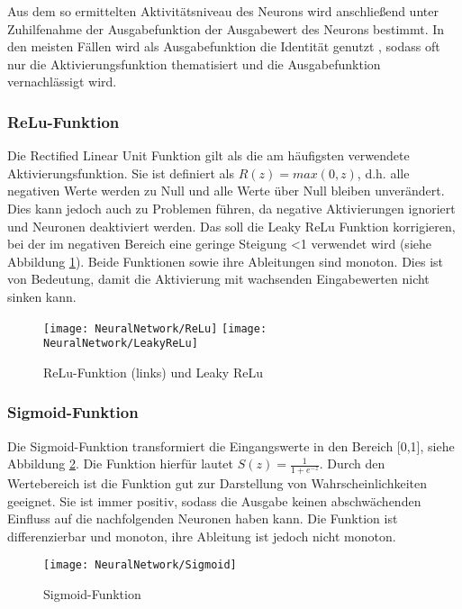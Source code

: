 Aus dem so ermittelten Aktivitätsniveau des Neurons wird anschließend unter Zuhilfenahme der Ausgabefunktion der Ausgabewert des 
Neurons bestimmt. In den meisten Fällen wird als Ausgabefunktion die Identität genutzt \cite{Beck.2018}, sodass oft nur die Aktivierungsfunktion 
thematisiert und die Ausgabefunktion vernachlässigt wird.\\

\subsubsection{ReLu-Funktion}
Die Rectified Linear Unit Funktion gilt als die am häufigsten verwendete Aktivierungsfunktion. Sie ist definiert als $R(z)=max(0,z)$, d.h. alle 
negativen Werte werden zu Null und alle Werte über Null bleiben unverändert. Dies kann jedoch auch zu Problemen führen, da negative
 Aktivierungen ignoriert und Neuronen deaktiviert werden. Das soll die Leaky ReLu Funktion korrigieren, bei der im negativen Bereich eine geringe 
 Steigung <1 verwendet wird (siehe Abbildung \ref{ReLu}). Beide Funktionen sowie ihre Ableitungen sind monoton. Dies ist von Bedeutung, damit die 
 Aktivierung mit wachsenden Eingabewerten nicht sinken kann. \cite{Gupta:2020b}\cite{AIUnitedRedaktion.20.12.2018}

\begin{figure}[H]
	\begin{center}
		\texttt{[image: NeuralNetwork/ReLu]}
		\texttt{[image: NeuralNetwork/LeakyReLu]}
		\caption{ReLu-Funktion (links) und Leaky ReLu} 
		\label{ReLu}
	\end{center}
\end{figure}

\subsubsection{Sigmoid-Funktion} 
Die Sigmoid-Funktion transformiert die Eingangswerte in den Bereich [0,1], siehe Abbildung \ref{Sigmoid}. Die Funktion hierfür lautet 
$S(z)=\frac{1}{1+e^{-z}}$. Durch den Wertebereich ist die Funktion gut zur Darstellung von Wahrscheinlichkeiten geeignet. 
Sie ist immer positiv, sodass die Ausgabe keinen abschwächenden Einfluss auf die nachfolgenden Neuronen haben kann. 
Die Funktion ist differenzierbar und monoton, ihre Ableitung ist jedoch nicht monoton. \cite{Gupta:2020b}\cite{AIUnitedRedaktion.20.12.2018}

\begin{figure}[H]
	\begin{center}
		\texttt{[image: NeuralNetwork/Sigmoid]}
		\caption{Sigmoid-Funktion} 
		\label{Sigmoid}
	\end{center}
\end{figure}


